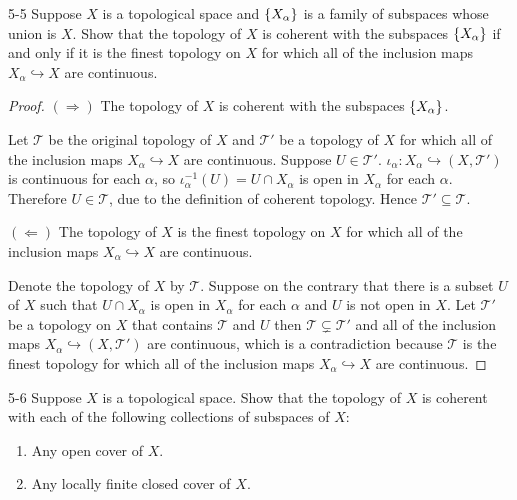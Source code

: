 \begin{problem}{5-5}\label{problem:5-5}
Suppose \( X \) is a topological space and \( \left\{{X_{\alpha}}\right\} \) is a family of subspaces whose union is \( X \). Show that the topology of \( X \) is coherent with the subspaces \( \left\{{X_{\alpha}}\right\} \) if and only if it is the finest topology on \( X \) for which all of the inclusion maps \( X_{\alpha} \hookrightarrow{} X \) are continuous.
\end{problem}

\begin{proof}
	\( (\Longrightarrow) \) The topology of \( X \) is coherent with the subspaces \( \left\{{X_{\alpha}}\right\} \).

	Let \( \mathscr{T} \) be the original topology of \( X \) and \( \mathscr{T}' \) be a topology of \( X \) for which all of the inclusion maps \( X_{\alpha} \hookrightarrow{} X \) are continuous. Suppose \( U \in \mathscr{T}' \). \( \iota_{\alpha}: X_{\alpha} \hookrightarrow{} (X, \mathscr{T}') \) is continuous for each \( \alpha \), so \( \iota_{\alpha}^{-1}(U) = U \cap X_{\alpha} \) is open in \( X_{\alpha} \) for each \( \alpha \). Therefore \( U \in \mathscr{T} \), due to the definition of coherent topology. Hence \( \mathscr{T}' \subseteq \mathscr{T} \).

	\( (\Longleftarrow) \) The topology of \( X \) is the finest topology on \( X \) for which all of the inclusion maps \( X_{\alpha} \hookrightarrow{} X \) are continuous.

	Denote the topology of \( X \) by \( \mathscr{T} \). Suppose on the contrary that there is a subset \( U \) of \( X \) such that \( U\cap X_{\alpha} \) is open in \( X_{\alpha} \) for each \( \alpha \) and \( U \) is not open in \( X \). Let \( \mathscr{T}' \) be a topology on \( X \) that contains \( \mathscr{T} \) and \( U \) then \( \mathscr{T} \subsetneq \mathscr{T}' \) and all of the inclusion maps \( X_{\alpha} \hookrightarrow{} (X, \mathscr{T}') \) are continuous, which is a contradiction because \( \mathscr{T} \) is the finest topology for which all of the inclusion maps \( X_{\alpha} \hookrightarrow{} X \) are continuous.
\end{proof}

\begin{problem}{5-6}\label{problem:5-6}
Suppose \( X \) is a topological space. Show that the topology of \( X \) is coherent with each of the following collections of subspaces of \( X \):
\begin{enumerate}[label={(\alph*)}]
	\item Any open cover of \( X \).
	\item Any locally finite closed cover of \( X \).
\end{enumerate}
\end{problem}

